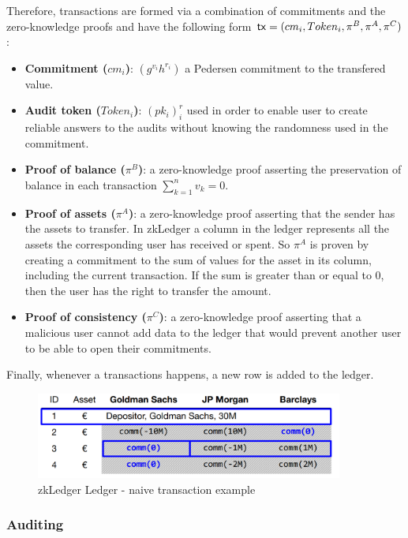 Therefore, transactions are formed via a combination of commitments and the zero-knowledge proofs and have the following form $\textup{\textsf{tx}} = (cm_i, Token_i, \pi^B, \pi^A, \pi^C)$:
\begin{itemize}
    \item \textbf{Commitment ($cm_i$)}: $(g^{v_i}h^{r_i})$ a Pedersen commitment to the transfered value.
    \item \textbf{Audit token ($Token_i$)}: $(pk_i)^r_i$ used in order to enable user to create reliable answers to the audits without knowing the randomness used in the commitment.
    \item \textbf{Proof of balance ($\pi^B$)}: a zero-knowledge proof asserting the preservation of balance in each transaction $\sum_{k=1}^n v_k = 0$.
    \item \textbf{Proof of assets ($\pi^A$)}: a zero-knowledge proof asserting that the sender has the assets to transfer. In zkLedger a column in the ledger represents all the assets the corresponding user has received or spent. So $\pi^A$ is proven by creating a commitment to the sum of values for the asset in its column, including the current transaction. If the sum is greater than or equal to 0, then the user has the right to transfer the amount. 
    \item \textbf{Proof of consistency ($\pi^C$)}: a zero-knowledge proof asserting that a malicious user cannot add  data to the ledger that would prevent another user to be able to open their commitments.
\end{itemize}

Finally, whenever a transactions happens, a new row is added to the ledger.

\begin{figure}
    \centering
    \includegraphics[width=0.9\textwidth]{images/zkLedger/zkledger.png}
    \caption{zkLedger Ledger - naive transaction example}
    \label{fig:zkLedger-table}
\end{figure}

\subsubsection{Auditing}

